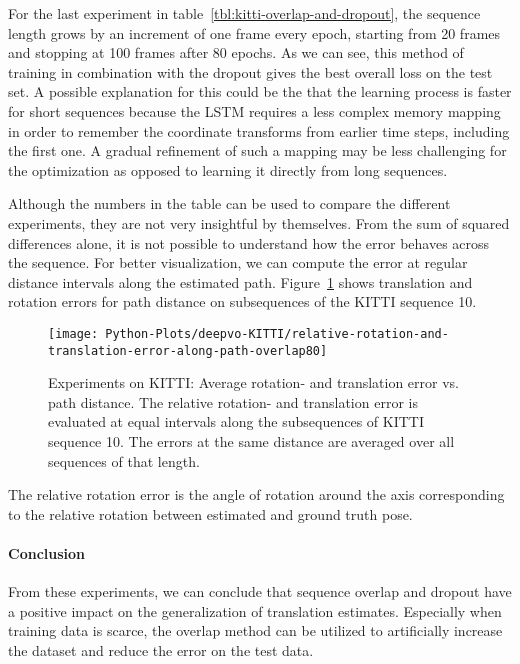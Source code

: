 		For the last experiment in table~\ref{tbl:kitti-overlap-and-dropout}, the sequence length grows by an increment of one frame every epoch, starting from 20 frames and stopping at 100 frames after 80 epochs.
		As we can see, this method of training in combination with the dropout gives the best overall loss on the test set.
		A possible explanation for this could be the that the learning process is faster for short sequences because the LSTM requires a less complex memory mapping in order to remember the coordinate transforms from earlier time steps, including the first one.
		A gradual refinement of such a mapping may be less challenging for the optimization as opposed to learning it directly from long sequences.
		
		Although the numbers in the table can be used to compare the different experiments, they are not very insightful by themselves.
		From the sum of squared differences alone, it is not possible to understand how the error behaves across the sequence.
		For better visualization, we can compute the error at regular distance intervals along the estimated path.
		Figure~\ref{fig:kitti-avg-rotation-translation-error-vs-path-distance} shows translation and rotation errors for path distance on subsequences of the KITTI sequence 10.
		\begin{figure}
			\centering
			\texttt{[image: Python-Plots/deepvo-KITTI/relative-rotation-and-translation-error-along-path-overlap80]}
			\caption[Experiments on KITTI: Average rotation- and translation error vs. path distance]
					{Experiments on KITTI: Average rotation- and translation error vs. path distance.
					 The relative rotation- and translation error is evaluated at equal intervals along the subsequences of KITTI sequence 10.
					 The errors at the same distance are averaged over all sequences of that length.
					 \label{fig:kitti-avg-rotation-translation-error-vs-path-distance}}
		\end{figure}
		The relative rotation error is the angle of rotation around the axis corresponding to the relative rotation between estimated and ground truth pose.
		
		\paragraph{Conclusion}
		From these experiments, we can conclude that sequence overlap and dropout have a positive impact on the generalization of translation estimates.
		Especially when training data is scarce, the overlap method can be utilized to artificially increase the dataset and reduce the error on the test data.
		
